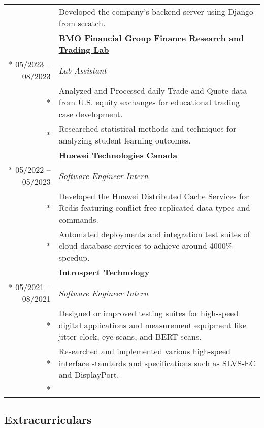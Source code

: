 \documentclass{article}
\begin{document}
\begin{tabularx}{\textwidth}{r X}
{			& {\small Developed the company's backend server using Django from scratch.} \\
		}{}
		\addlinespace
		& \textbf{\href{https://inside.rotman.utoronto.ca/financelab/}{BMO Financial Group Finance Research and Trading Lab}} \\*
		05/2023 -- 08/2023 & \textit{Lab Assistant} \\*
		& {\small Analyzed and Processed daily Trade and Quote data from U.S. equity exchanges for educational trading case development.} \\*
		& {\small Researched statistical methods and techniques for analyzing student learning outcomes.} \\
		\addlinespace
		& \textbf{\href{https://www.huawei.com/ca/}{Huawei Technologies Canada}} \\*
		05/2022 -- 05/2023 & \textit{Software Engineer Intern} \\*
		& {\small Developed the Huawei Distributed Cache Services for Redis featuring conflict-free replicated data types and commands.} \\*
		& {\small Automated deployments and integration test suites of cloud database services to achieve around 4000\% speedup.} \\
		\addlinespace
		& \textbf{\href{https://introspect.ca/}{Introspect Technology}} \\*
		05/2021 -- 08/2021 & \textit{Software Engineer Intern} \\*
		& {\small Designed or improved testing suites for high-speed digital applications and measurement equipment like jitter-clock, eye scans, and BERT scans.} \\*
		& {\small Researched and implemented various high-speed interface standards and specifications such as SLVS-EC and DisplayPort.} \\*
	\end{tabularx}

	\subsection*{Extracurriculars}
\end{document}

